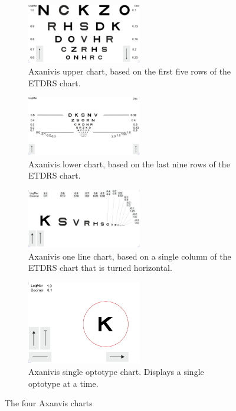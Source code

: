 \documentclass[12pt,a4paper,notitlepage]{report}
\begin{document}
\begin{figure}[ht!]
\centering
\begin{subfigure}{.5\textwidth}
  \centering
  \includegraphics[width=50mm]{images/etdrs_top.png}
  \caption{Axanivis upper chart, based on the first five rows of the ETDRS chart.}
  \label{fig:etdrs_upper1}
\end{subfigure}%
\begin{subfigure}{.5\textwidth}
  \centering
  \includegraphics[width=50mm]{images/etdrs_bottom.png}
  \caption{Axanivis lower chart, based on the last nine rows of the ETDRS chart.}
  \label{fig:etdrs_lower1}
\end{subfigure}
\begin{subfigure}{.4\textwidth}
	\centering
	\includegraphics[width=50mm]{images/etdrs_one_line.png}
  \caption{Axanivis one line chart, based on a single column of the ETDRS chart that is turned horizontal.}
\end{subfigure}
\begin{subfigure}{.4\textwidth}
	\centering
	\includegraphics[width=50mm]{images/etdrs_single.png}
  \caption{Axanivis single optotype chart. Displays a single optotype at a time.}
\end{subfigure}
\caption{The four Axanvis charts}
\label{fig:axanivis}
\end{figure}
\end{document}
